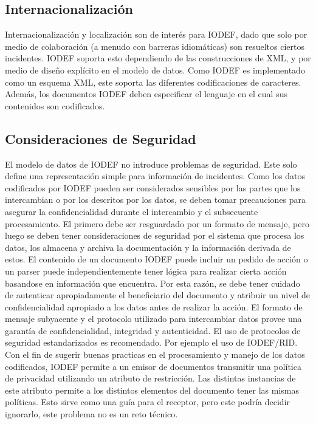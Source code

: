 \subsection{Internacionalización}
Internacionalización y localización son de interés para IODEF, dado que solo por 
medio de colaboración (a menudo con barreras idiomáticas) son resueltos ciertos 
incidentes. IODEF soporta esto dependiendo de las construcciones de XML, y por 
medio de diseño explícito en el modelo de datos.
Como IODEF es implementado como un esquema XML, este soporta las diferentes 
codificaciones de caracteres. Además, los documentos IODEF deben especificar el 
lenguaje en el cual sus contenidos son codificados. 

\subsection{Consideraciones de Seguridad}
El modelo de datos de IODEF no introduce problemas de seguridad. Este solo 
define una representación simple para información de incidentes. Como los datos 
codificados por IODEF pueden ser considerados sensibles por las partes que los 
intercambian o por los descritos por los datos, se deben tomar precauciones para 
asegurar la confidencialidad durante el intercambio y el subsecuente 
procesamiento. El primero debe ser resguardado por un formato de mensaje, pero 
luego se deben tener consideraciones de seguridad por el sistema que procesa los 
datos, los almacena y archiva la documentación y la información derivada de 
estos.
El contenido de un documento IODEF puede incluir un pedido de acción o un parser 
puede independientemente tener lógica para realizar cierta acción basandose en 
información que encuentra. Por esta razón, se debe tener cuidado de autenticar 
apropiadamente el beneficiario del documento y atribuir un nivel de 
confidencialidad apropiado a los datos antes de realizar la acción.
El formato de mensaje subyacente  y el protocolo utilizado para intercambiar 
datos provee una garantía de confidencialidad, integridad  y autenticidad. El 
uso de protocolos de seguridad estandarizados es recomendado. Por ejemplo el uso 
de IODEF/RID.
Con el fin de sugerir buenas practicas en el  procesamiento y manejo de los 
datos codificados, IODEF  permite a un emisor de documentos transmitir una 
política de privacidad utilizando un atributo de restricción. Las distintas 
instancias de este atributo permite a los distintos elementos del documento 
tener las mismas políticas. Esto sirve como una guía para el receptor, pero este 
podría decidir ignorarlo, este problema no es un reto técnico.

